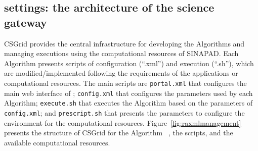 \begin{table}[!t]
\centering
\caption{Comparison of alternatives for provenance support in Spark.}
\label{tab:superalignments}
\end{table}

\subsection{\system settings: the architecture of the science gateway}

CSGrid provides the central infrastructure for developing the Algorithms and managing executions using the computational resources of SINAPAD. Each Algorithm presents scripts of configuration (“.xml”) and execution (“.sh”), which are modified/implemented following the requirements of the applications or computational resources. The main scripts are \texttt{portal.xml} that configures the main web interface of \system; \texttt{config.xml} that configures the parameters used by each Algorithm; \texttt{execute.sh} that executes the Algorithm based on the parameters of \texttt{config.xml}; and \texttt{prescript.sh} that presents the parameters to configure the environment for the computational resources. Figure~\ref{fig:raxmlmanagement} presents the structure of CSGrid for the Algorithm ~\raxml, the scripts, and the available computational resources.

